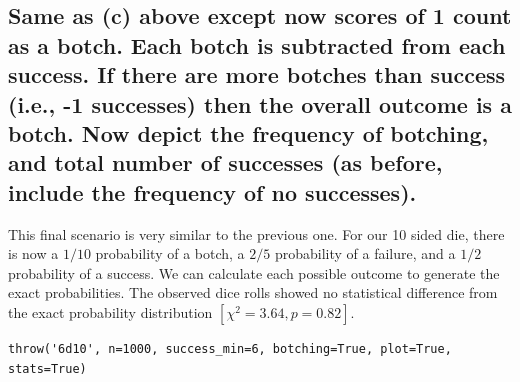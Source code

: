 \documentclass{article}
\begin{document}

\subsection{Same as (c) above except now scores of 1 count as a botch. Each botch is subtracted from each success. If there are more botches than success (i.e., -1 successes) then the overall outcome is a botch. Now depict the frequency of botching, and total number of successes (as before, include the frequency of no successes).}

This final scenario is very similar to the previous one. For our 10 sided die, there is now a $1/10$ probability of a botch, a $2/5$ probability of a failure, and a $1/2$ probability of a success. We can calculate each possible outcome to generate the exact probabilities. The observed dice rolls showed no statistical difference from the exact probability distribution $[\chi^2=3.64, p=0.82]$.
\\
\begin{lstlisting}
throw('6d10', n=1000, success_min=6, botching=True, plot=True, stats=True)
\end{lstlisting}
\end{document}
